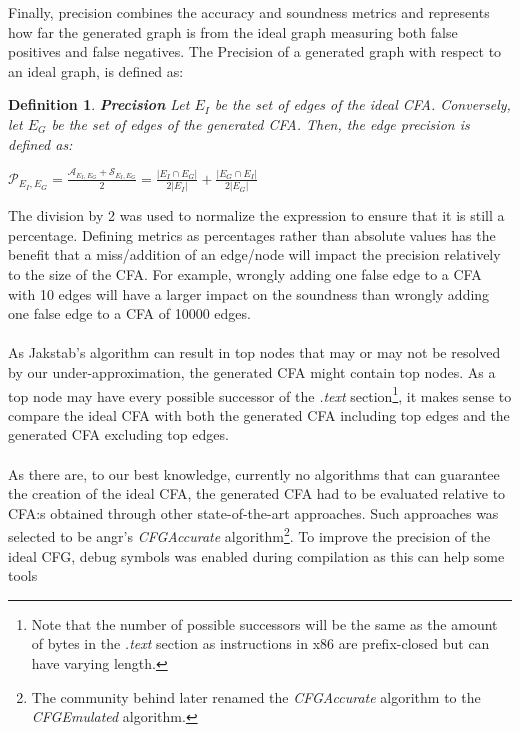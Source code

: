 \documentclass{kththesis}
\newtheorem*{definition}{Definition}
\renewcommand{\it}[1]{\textit{#1}}
\begin{document}
Finally, precision combines the accuracy and soundness metrics and represents how far the generated graph is from the ideal graph measuring both false positives and false negatives. The Precision of a generated graph with respect to an ideal graph, is defined as:
\begin{definition} \textbf{Precision}
Let $E_I$ be the set of edges of the ideal CFA. Conversely, let $E_G$ be the set of edges of the generated CFA. Then, the edge precision is defined as:
\begin{center}
$\mathcal{P}_{E_I,E_G} = \frac{\mathcal{A}_{E_I,E_G}+\mathcal{S}_{E_I,E_G}}{2} = \frac{|E_I \cap E_G|}{2|E_I|}+\frac{|E_G \cap E_I|}{2|E_G|}$
\end{center}
\end{definition}
\noindent
The division by 2 was used to normalize the expression to ensure that it is still a percentage. Defining metrics as percentages rather than absolute values has the benefit that a miss/addition of an edge/node will impact the precision relatively to the size of the CFA. For example, wrongly adding one false edge to a CFA with 10 edges will have a larger impact on the soundness than wrongly adding one false edge to a CFA of 10000 edges.
\\ \\%
As Jakstab's algorithm can result in top nodes that may or may not be resolved by our under-approximation, the generated CFA might contain top nodes. As a top node may have every possible successor of the \it{.text} section\footnote{Note that the number of possible successors will be the same as the amount of bytes in the \it{.text} section as instructions in x86 are prefix-closed but can have varying length.}, it makes sense to compare the ideal CFA with both the generated CFA including top edges and the generated CFA excluding top edges. 
\\ \\
As there are, to our best knowledge, currently no algorithms that can guarantee the creation of the ideal CFA, the generated CFA had to be evaluated relative to CFA:s obtained through other state-of-the-art approaches. Such approaches was selected to be angr's \textit{CFGAccurate} algorithm\cite{angr}\footnote{The community behind  later renamed the \textit{CFGAccurate} algorithm to the \textit{CFGEmulated} algorithm.}. To improve the precision of the ideal CFG, debug symbols was enabled during compilation as this can help some tools\cite{alternating}
\end{document}
